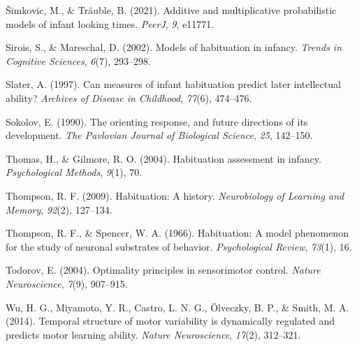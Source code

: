 \documentclass[10pt, letterpaper]{article}
\newenvironment{CSLReferences}%
  {}%
  {\par}
\begin{document}
\begin{CSLReferences}{1}{0}
\leavevmode{}%
Šimkovic, M., \& Träuble, B. (2021). Additive and multiplicative
probabilistic models of infant looking times. \emph{PeerJ}, \emph{9},
e11771.

\leavevmode{}%
Sirois, S., \& Mareschal, D. (2002). Models of habituation in infancy.
\emph{Trends in Cognitive Sciences}, \emph{6}(7), 293--298.

\leavevmode{}%
Slater, A. (1997). Can measures of infant habituation predict later
intellectual ability? \emph{Archives of Disease in Childhood},
\emph{77}(6), 474--476.

\leavevmode{}%
Sokolov, E. (1990). The orienting response, and future directions of its
development. \emph{The Pavlovian Journal of Biological Science},
\emph{25}, 142--150.

\leavevmode{}%
Thomas, H., \& Gilmore, R. O. (2004). Habituation assessment in infancy.
\emph{Psychological Methods}, \emph{9}(1), 70.

\leavevmode{}%
Thompson, R. F. (2009). Habituation: A history. \emph{Neurobiology of
Learning and Memory}, \emph{92}(2), 127--134.

\leavevmode{}%
Thompson, R. F., \& Spencer, W. A. (1966). Habituation: A model
phenomenon for the study of neuronal substrates of behavior.
\emph{Psychological Review}, \emph{73}(1), 16.

\leavevmode{}%
Todorov, E. (2004). Optimality principles in sensorimotor control.
\emph{Nature Neuroscience}, \emph{7}(9), 907--915.

\leavevmode{}%
Wu, H. G., Miyamoto, Y. R., Castro, L. N. G., Ölveczky, B. P., \& Smith,
M. A. (2014). Temporal structure of motor variability is dynamically
regulated and predicts motor learning ability. \emph{Nature
Neuroscience}, \emph{17}(2), 312--321.

\end{CSLReferences}


\end{document}
